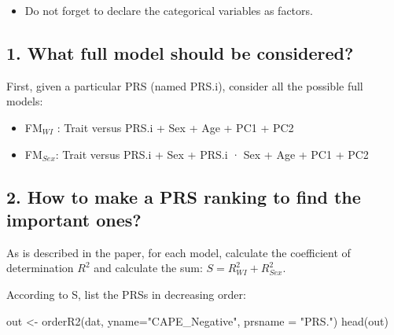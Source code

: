 \documentclass[
]{article}
\newenvironment{Shaded}{\begin{snugshade}}{\end{snugshade}}
\newcommand{\AttributeTok}[1]{\textcolor[rgb]{0.77,0.63,0.00}{#1}}
\newcommand{\FunctionTok}[1]{\textcolor[rgb]{0.00,0.00,0.00}{#1}}
\newcommand{\NormalTok}[1]{#1}
\newcommand{\OtherTok}[1]{\textcolor[rgb]{0.56,0.35,0.01}{#1}}
\newcommand{\SpecialCharTok}[1]{\textcolor[rgb]{0.00,0.00,0.00}{#1}}
\newcommand{\StringTok}[1]{\textcolor[rgb]{0.31,0.60,0.02}{#1}}
\providecommand{\tightlist}{%
  \setlength{\itemsep}{0pt}\setlength{\parskip}{0pt}}
\begin{document}
\bigskip

\begin{itemize}
\tightlist
\item
  Do not forget to declare the categorical variables as factors.
\end{itemize}

\begin{Shaded}
\end{Shaded}

\hypertarget{what-full-model-should-be-considered}{%
\subsection{1. What full model should be
considered?}\label{what-full-model-should-be-considered}}

First, given a particular PRS (named PRS.i), consider all the possible
full models:

\begin{itemize}
\tightlist
\item
  FM\(_{WI}\) : Trait versus PRS.i + Sex + Age + PC1 + PC2
\item
  FM\(_{Sex}\): Trait versus PRS.i + Sex + PRS.i · Sex + Age + PC1 + PC2
\end{itemize}

\hypertarget{how-to-make-a-prs-ranking-to-find-the-important-ones}{%
\subsection{2. How to make a PRS ranking to find the important
ones?}\label{how-to-make-a-prs-ranking-to-find-the-important-ones}}

As is described in the paper, for each model, calculate the coefficient
of determination \(R^2\) and calculate the sum:
\(S = R^2_{WI} + R^2_{Sex}\).

According to S, list the PRSs in decreasing order:

\begin{Shaded}
\begin{Highlighting}[]
\NormalTok{out }\OtherTok{\textless{}{-}} \FunctionTok{orderR2}\NormalTok{(dat, }\AttributeTok{yname=}\StringTok{"CAPE\_Negative"}\NormalTok{, }\AttributeTok{prsname =} \StringTok{"PRS."}\NormalTok{)}
\FunctionTok{head}\NormalTok{(out)}
\end{Highlighting}
\end{Shaded}
\end{document}
